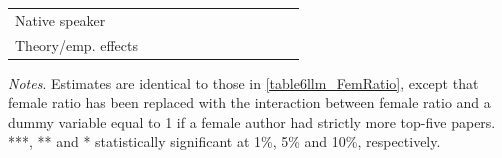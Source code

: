 \begin{table}
\begin{threeparttable}
\begin{tabular}{p{3cm}S@{}S@{}S@{}S@{}S@{}S@{}S@{}S@{}S@{}S@{}S@{}}
            Native speaker                &               &           {}   &               &           {}   &               &           {}   &               &           {}   &               &               &               \\
            Theory/emp. effects           &               &           {}   &               &           {}   &               &           {}   &               &           {}   &               &               &               \\
            \bottomrule
        \end{tabular}
        \begin{tablenotes}
            \tiny
            \item \textit{Notes}. Estimates are identical to those in \autoref{table6llm_FemRatio}, except that female ratio has been replaced with the interaction between female ratio and a dummy variable equal to 1 if a female author had strictly more top-five papers. ***, ** and * statistically significant at 1\%, 5\% and 10\%, respectively.
        \end{tablenotes}
    \end{threeparttable}

\end{table}

